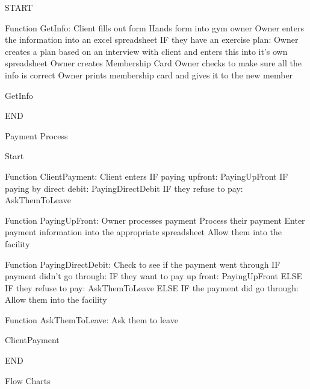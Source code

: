 \begin{python}

START

Function GetInfo:
	Client fills out form
	Hands form into gym owner
	Owner enters the information into an excel spreadsheet
	IF they have an exercise plan:
		Owner creates a plan based on an interview with client and enters this into it’s
own spreadsheet
	Owner creates Membership Card
	Owner checks to make sure all the info is correct
	Owner prints membership card and gives it to the new member

GetInfo

END

\end{python}

Payment Process

\begin{python}
Start

Function ClientPayment:
	Client enters
	IF paying upfront:
		PayingUpFront
	IF paying by direct debit:
		PayingDirectDebit
	IF they refuse to pay:
		AskThemToLeave

Function PayingUpFront:
	Owner processes payment
	Process their payment
	Enter payment information into the appropriate spreadsheet
	Allow them into the facility

Function PayingDirectDebit:
	Check to see if the payment went through
	IF payment didn’t go through:
		IF they want to pay up front:
			PayingUpFront
		ELSE IF they refuse to pay:
			AskThemToLeave
	ELSE IF the payment did go through:
		Allow them into the facility

Function AskThemToLeave:
	Ask them to leave

ClientPayment 

END
\end{python}

Flow Charts

